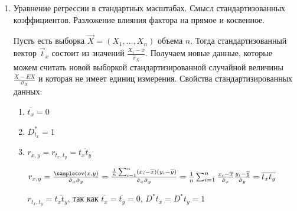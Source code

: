 \documentclass[12pt]{article}
\begin{document}
\begin{enumerate}
    Пусть $X = \beta_0 + \beta_1 Z_1 + \dots + \beta_k Z_k + \varepsilon$ - теоретическая модель линейной регрессии, $\varepsilon \in N(0, \sigma^2)$ и независимы

    По методу наименьших квадратов была построена модель $\hat X = b_0 + b_1 Z_1 + \dots + b_k Z_k$. Тогда $\hat \varepsilon_i = X_i - \hat X_i$ - экспериментальная (или эмпирическая) ошибка

    Согласно следствию из теоремы $S^2 = \frac{1}{n - k - 1} \sum_{i = 1}^n \hat \varepsilon_i^2$ - несмещенная оценка $\sigma^2$

    \Def Величину $S$ называют стандартной ошибкой регрессии 

    Из прошлых лекций знаем, что $D b_i = \sigma^2 (A^{-1})_{ii}$, где $A = Z Z^T$, $Z = (Z:{(i)}_j)$ - матрица плана

    Из этого $\hat D b_i = S^2 (A^{-1})_{ii}$ - оценка дисперсии

    \Def $S_{b_i} = S \sqrt{(A^{-1})_{ii}}$ - стандартная ошибка коэффициента регрессии $b_i$

    \item Уравнение регрессии в стандартных масштабах. Смысл стандартизованных коэффициентов. Разложение влияния фактора на прямое и косвенное.

    Пусть есть выборка $\vec X = (X_1, \dots, X_n)$ объема $n$. Тогда стандартизованный вектор $\vec t_x$ состоит из значений $\frac{X_i - \overline{x}}{\hat \sigma_X}$. Получаем новые данные, которые можем считать новой выборкой стандартизированной случайной величины $\frac{X - EX}{\sigma_X}$ и которая не имеет единиц измерения. Свойства стандартизированных данных:

    \begin{enumerate}
        \item $\overline{t_x} = 0$
        \item $D^*_{t_x} = 1$
        \item $r_{x,y} = r_{t_x, t_y} = \overline{t_x t_y}$
        \begin{MyProof}
            $r_{x,y} = \frac{\samplecov(x, y)}{\hat \sigma_x \hat \sigma_y} = 
            \frac{\frac{1}{n} \sum_{i = 1}^n (x_i - \overline{x})(y_i - \overline{y})}{\hat \sigma_x \hat \sigma_y} = 
            \frac{1}{n} \sum_{i = 1}^n \frac{x_i - \overline{x}}{\hat \sigma_x} \frac{y_i - \overline{y}}{\hat \sigma_y} = \overline{t_x t_y}$

            $r_{t_x, t_y} = \overline{t_x t_y}$, так как $\overline{t_x} = \overline{t_y} = 0$, $D^* t_x = D^* t_y = 1$
        \end{MyProof}
    \end{enumerate}


\end{enumerate}
\end{document}
